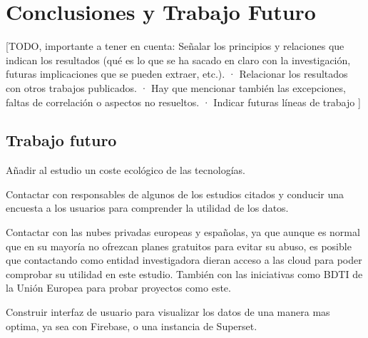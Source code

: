 \chapter{Conclusiones y Trabajo Futuro}
\label{cap:conclusiones}


[TODO, importante a tener en cuenta:
Señalar los principios y relaciones que indican los resultados (qué es lo que se ha sacado en claro con la investigación, futuras implicaciones que se pueden extraer, etc.).
· Relacionar los resultados con otros trabajos publicados.
· Hay que mencionar también las excepciones, faltas de correlación o aspectos no resueltos.
· Indicar futuras líneas de trabajo
]

\section*{Trabajo futuro}

Añadir al estudio un coste ecológico de las tecnologías.

Contactar con responsables de algunos de los estudios citados y conducir una encuesta a los usuarios para comprender la utilidad de los datos.

Contactar con las nubes privadas europeas y españolas, ya que aunque es normal que en su mayoría no ofrezcan planes gratuitos para evitar su abuso, es posible que contactando como entidad investigadora dieran acceso a las cloud para poder comprobar su utilidad en este estudio. También con las iniciativas como BDTI de la Unión Europea \citep{BDTIEuropeProject} para probar proyectos como este.

Construir interfaz de usuario para visualizar los datos de una manera mas optima, ya sea con Firebase, o una instancia de Superset.